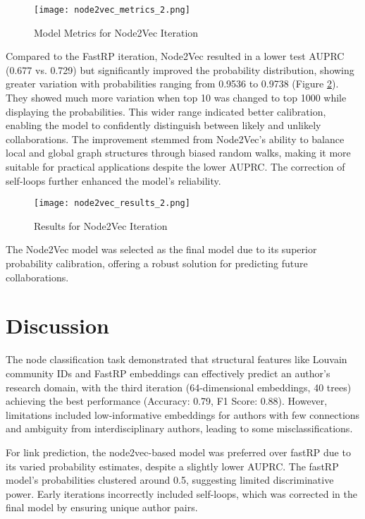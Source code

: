 \documentclass[conference, 12pt]{IEEEtran}
\begin{document}
\begin{figure}[h]
    \centering
    \texttt{[image: node2vec\_metrics\_2.png]}
    \caption{Model Metrics for Node2Vec Iteration}
    \label{fig:link_prediction_node2vec_metrics}
\end{figure}

Compared to the FastRP iteration, Node2Vec resulted in a lower test AUPRC (0.677 vs. 0.729) but significantly improved the probability distribution, showing greater variation with probabilities ranging from 0.9536 to 0.9738 (Figure \ref{fig:link_prediction_node2vec_probabilities}). They showed much more variation when top 10 was changed to top 1000 while displaying the probabilities. This wider range indicated better calibration, enabling the model to confidently distinguish between likely and unlikely collaborations. The improvement stemmed from Node2Vec’s ability to balance local and global graph structures through biased random walks, making it more suitable for practical applications despite the lower AUPRC. The correction of self-loops further enhanced the model’s reliability.

\begin{figure}[h]
    \centering
    \texttt{[image: node2vec\_results\_2.png]}
    \caption{Results for Node2Vec Iteration}
    \label{fig:link_prediction_node2vec_probabilities}
\end{figure}

The Node2Vec model was selected as the final model due to its superior probability calibration, offering a robust solution for predicting future collaborations.
\section{Discussion}
The node classification task demonstrated that structural features like Louvain community IDs and FastRP embeddings can effectively predict an author's research domain, with the third iteration (64-dimensional embeddings, 40 trees) achieving the best performance (Accuracy: 0.79, F1 Score: 0.88). However, limitations included low-informative embeddings for authors with few connections and ambiguity from interdisciplinary authors, leading to some misclassifications.

For link prediction, the node2vec-based model was preferred over fastRP due to its varied probability estimates, despite a slightly lower AUPRC. The fastRP model's probabilities clustered around 0.5, suggesting limited discriminative power. Early iterations incorrectly included self-loops, which was corrected in the final model by ensuring unique author pairs.
\end{document}
